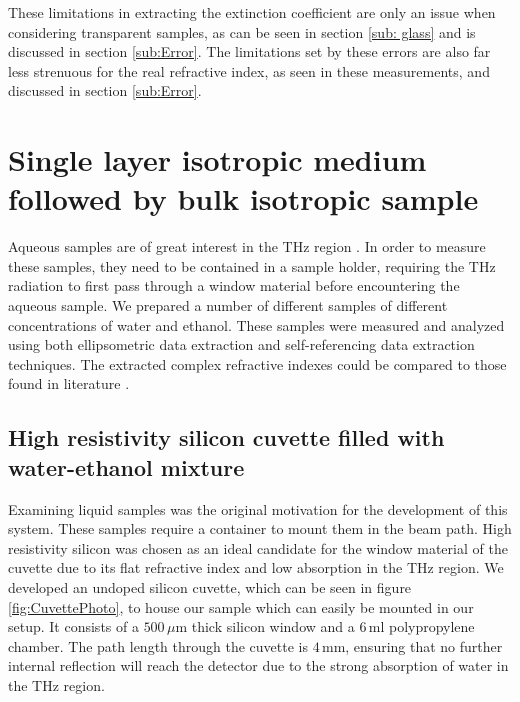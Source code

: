 These limitations in extracting the extinction coefficient are only an issue when considering transparent samples, as can be seen in section \ref{sub: glass} and is discussed in section \ref{sub:Error}. The limitations set by these errors are also far less strenuous for the real refractive index, as seen in these measurements, and discussed in section \ref{sub:Error}.

\section{Single layer isotropic medium followed by bulk isotropic sample}
\label{sec: Duo_res}

Aqueous samples are of great interest in the THz region \cite{B804734K, Novelli2017, Sun2014}. In order to measure these samples, they need to be contained in a sample holder, requiring the THz radiation to first pass through a window material before encountering the aqueous sample.   We prepared a number of different samples of different concentrations of water and ethanol. These samples were measured and analyzed using both ellipsometric data extraction and self-referencing data extraction techniques.  The extracted complex refractive indexes could be compared to those found in literature \cite{Jepsen-2007, Kindt1996, Ronne1997, Barthel1990}.




\subsection{High resistivity silicon cuvette filled with water-ethanol mixture}
\label{sub: HR-Silicon-Water-Eth}

Examining liquid samples was the original motivation for the development of this system. These samples require a container to mount them in the beam path.
High resistivity silicon was chosen as an ideal candidate for the window material of the cuvette due to its flat refractive index and low absorption in the THz region. We developed an undoped silicon cuvette, which can be seen in figure \ref{fig:CuvettePhoto}, to house our sample which can easily be mounted in our setup. It consists of a $500\,\mu$m thick silicon window and a $6\,$ml polypropylene chamber. The path length through the cuvette is $4\,$mm, ensuring that no further internal reflection will reach the detector due to the strong absorption of water in the THz region.

